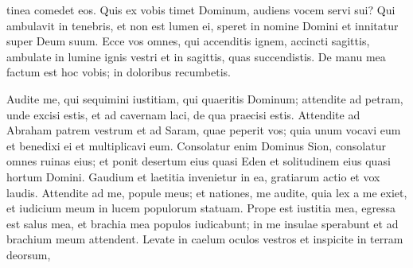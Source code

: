 \begin{biblechapter}
\begin{biblechapter}
\begin{biblechapter}
\begin{biblechapter}
\begin{biblechapter}
\begin{biblechapter}
\begin{biblechapter}
\begin{biblechapter}
\begin{biblechapter}
\begin{biblechapter}
\begin{biblechapter}
\begin{biblechapter}
\begin{biblechapter}
\begin{biblechapter}
\begin{biblechapter}
\begin{biblechapter}
\begin{biblechapter}
\begin{biblechapter}
\begin{biblechapter}
\begin{biblechapter}
\begin{biblechapter}
\begin{biblechapter}
\begin{biblechapter}
\begin{biblechapter}
\begin{biblechapter}
\begin{biblechapter}
\begin{biblechapter}
\begin{biblechapter}
\begin{biblechapter}
\begin{biblechapter}
\begin{biblechapter}
\begin{biblechapter}
\begin{biblechapter}
\begin{biblechapter}
\begin{biblechapter}
\begin{biblechapter}
\begin{biblechapter}
\begin{biblechapter}
\begin{biblechapter}
\begin{biblechapter}
\begin{biblechapter}
\begin{biblechapter}
\begin{biblechapter}
\begin{biblechapter}
\begin{biblechapter}
\begin{biblechapter}
\begin{biblechapter}
\begin{biblechapter}
\begin{biblechapter}
\begin{biblechapter}
 tinea comedet eos.
 \verse Quis ex vobis timet Dominum,
 audiens vocem servi sui?
 Qui ambulavit in tenebris,
 et non est lumen ei,
 speret in nomine Domini
 et innitatur super Deum suum.
 \verse Ecce vos omnes, qui accenditis ignem,
 accincti sagittis,
 ambulate in lumine ignis vestri
 et in sagittis, quas succendistis.
 De manu mea factum est hoc vobis;
 in doloribus recumbetis.
 
\begin{biblechapter}
\verse Audite me, qui sequimini iustitiam,
 qui quaeritis Dominum;
 attendite ad petram, unde excisi estis,
 et ad cavernam laci, de qua praecisi estis.
 \verse Attendite ad Abraham patrem vestrum
 et ad Saram, quae peperit vos;
 quia unum vocavi eum
 et benedixi ei et multiplicavi eum.
 \verse Consolatur enim Dominus Sion,
 consolatur omnes ruinas eius;
 et ponit desertum eius quasi Eden
 et solitudinem eius quasi hortum Domini.
 Gaudium et laetitia invenietur in ea,
 gratiarum actio et vox laudis.
 \verse Attendite ad me, popule meus;
 et nationes, me audite,
 quia lex a me exiet,
 et iudicium meum in lucem populorum statuam.
 \verse Prope est iustitia mea,
 egressa est salus mea,
 et brachia mea populos iudicabunt;
 in me insulae sperabunt
 et ad brachium meum attendent.
 \verse Levate in caelum oculos vestros
 et inspicite in terram deorsum,

\end{biblechapter}
\end{biblechapter}
\end{biblechapter}
\end{biblechapter}
\end{biblechapter}
\end{biblechapter}
\end{biblechapter}
\end{biblechapter}
\end{biblechapter}
\end{biblechapter}
\end{biblechapter}
\end{biblechapter}
\end{biblechapter}
\end{biblechapter}
\end{biblechapter}
\end{biblechapter}
\end{biblechapter}
\end{biblechapter}
\end{biblechapter}
\end{biblechapter}
\end{biblechapter}
\end{biblechapter}
\end{biblechapter}
\end{biblechapter}
\end{biblechapter}
\end{biblechapter}
\end{biblechapter}
\end{biblechapter}
\end{biblechapter}
\end{biblechapter}
\end{biblechapter}
\end{biblechapter}
\end{biblechapter}
\end{biblechapter}
\end{biblechapter}
\end{biblechapter}
\end{biblechapter}
\end{biblechapter}
\end{biblechapter}
\end{biblechapter}
\end{biblechapter}
\end{biblechapter}
\end{biblechapter}
\end{biblechapter}
\end{biblechapter}
\end{biblechapter}
\end{biblechapter}
\end{biblechapter}
\end{biblechapter}
\end{biblechapter}
\end{biblechapter}
